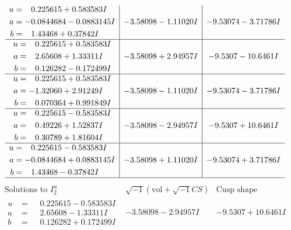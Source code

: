 \documentclass[1p]{elsarticle_modified}
\theoremstyle{definition}
\newcommand{\I}{\sqrt{-1}}
\begin{document}
$$\begin{array}{c|c|c}
\begin{aligned}
u &= \phantom{-}0.225615 + 0.583583 I \\
a &= -0.0844684 - 0.0883145 I \\
b &= \phantom{-}1.43468 + 0.37842 I\end{aligned}
 & -3.58098 - 1.11020 I & -9.53074 - 3.71786 I \\ \hline\begin{aligned}
u &= \phantom{-}0.225615 + 0.583583 I \\
a &= \phantom{-}2.65608 + 1.33311 I \\
b &= \phantom{-}0.126282 - 0.172499 I\end{aligned}
 & -3.58098 + 2.94957 I & -9.5307 - 10.6461 I \\ \hline\begin{aligned}
u &= \phantom{-}0.225615 + 0.583583 I \\
a &= -1.32060 + 2.91249 I \\
b &= \phantom{-}0.070364 + 0.991849 I\end{aligned}
 & -3.58098 - 1.11020 I & -9.53074 - 3.71786 I \\ \hline\begin{aligned}
u &= \phantom{-}0.225615 - 0.583583 I \\
a &= \phantom{-}0.49226 + 1.52837 I \\
b &= \phantom{-}0.30789 + 1.81604 I\end{aligned}
 & -3.58098 - 2.94957 I & -9.5307 + 10.6461 I \\ \hline\begin{aligned}
u &= \phantom{-}0.225615 - 0.583583 I \\
a &= -0.0844684 + 0.0883145 I \\
b &= \phantom{-}1.43468 - 0.37842 I\end{aligned}
 & -3.58098 + 1.11020 I & -9.53074 + 3.71786 I\\
 \hline 
 \end{array}$$\newpage$$\begin{array}{c|c|c}  
\text{Solutions to }I^u_{2}& \I (\text{vol} + \sqrt{-1}CS) & \text{Cusp shape}\\
 \hline 
\begin{aligned}
u &= \phantom{-}0.225615 - 0.583583 I \\
a &= \phantom{-}2.65608 - 1.33311 I \\
b &= \phantom{-}0.126282 + 0.172499 I\end{aligned}
 & -3.58098 - 2.94957 I & -9.5307 + 10.6461 I \\ \hline\begin{aligned}

\end{aligned}
\end{array}$$
\end{document}
